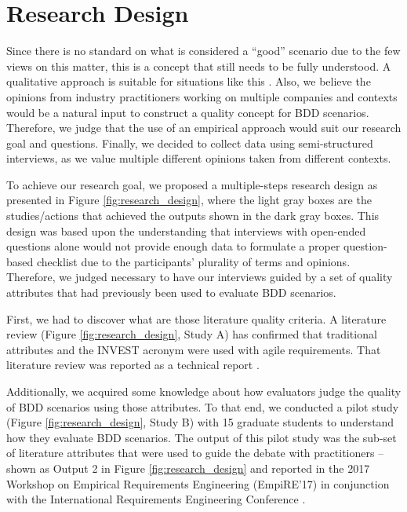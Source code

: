 \section{Research Design}

Since there is no standard on what is considered a ``good'' scenario due to the few views on this matter, this is a concept that still needs to be fully understood. A qualitative approach is suitable for situations like this \cite{Creswell_2008}. Also, we believe the opinions from industry practitioners working on multiple companies and contexts would be a natural input to construct a quality concept for BDD scenarios. Therefore, we judge that the use of an empirical approach would suit our research goal and questions. Finally, we decided to collect data using semi-structured interviews, as we value multiple different opinions taken from different contexts.

To achieve our research goal, we proposed a multiple-steps research design as presented in Figure \ref{fig:research_design}, where the light gray boxes are the studies/actions that achieved the outputs shown in the dark gray boxes. This design was based upon the understanding that interviews with open-ended questions alone would not provide enough data to formulate a proper question-based checklist due to the participants' plurality of terms and opinions. Therefore, we judged necessary to have our interviews guided by a set of quality attributes that had previously been used to evaluate BDD scenarios.

First, we had to discover what are those literature quality criteria. A literature review (Figure \ref{fig:research_design}, Study A) has confirmed that traditional attributes \cite{Babok_2009}\cite{Babok_2015} and the INVEST\cite{Cohn_2004} acronym were used with agile requirements. That literature review was reported as a technical report \cite{Literature_Review_Technical_Report_2018}.

Additionally, we acquired some knowledge about how evaluators judge the quality of BDD scenarios using those attributes. To that end, we conducted a pilot study (Figure \ref{fig:research_design}, Study B) with 15 graduate students to understand how they evaluate BDD scenarios. The output of this pilot study was the sub-set of literature attributes that were used to guide the debate with practitioners -- shown as Output 2 in Figure \ref{fig:research_design} and reported in the 2017 Workshop on Empirical Requirements Engineering (EmpiRE'17) in conjunction with the International Requirements Engineering Conference \cite{Empire_2017}.

